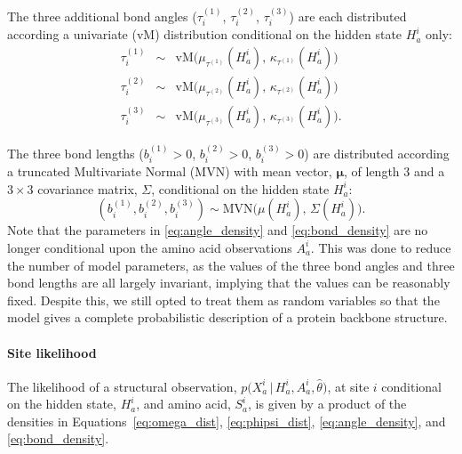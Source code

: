 \documentclass[nogrid]{MBE}%
\begin{document}
The three additional bond angles ($\tau^{(1)}_{i}$, $\tau^{(2)}_{i}$, $\tau^{(3)}_{i}$) are each distributed according a univariate (vM) distribution conditional on the hidden state $H_{a}^{i}$ only:
\begin{equation}
\label{eq:angle_density}
\begin{array}{ccc}
\tau^{(1)}_{i} & \sim & \text{vM}\big(\mu_{\tau^{(1)}}(H_{a}^{i}),\,\ensuremath{\kappa_{\tau^{(1)}}(H_{a}^{i})}\big)
\\
\tau^{(2)}_{i} & \sim & \text{vM}\big(\mu_{\tau^{(2)}}(H_{a}^{i}),\,\ensuremath{\kappa_{\tau^{(2)}}(H_{a}^{i})}\big)
\\
\tau^{(3)}_{i} & \sim & \text{vM}\big(\mu_{\tau^{(3)}}(H_{a}^{i}),\,\ensuremath{\kappa_{\tau^{(3)}}(H_{a}^{i})}\big).
\end{array}
\end{equation}

The three bond lengths ($b_{i}^{(1)}>0$, $b_{i}^{(2)}>0$, $b_{i}^{(3)}>0$) are 
distributed according a truncated Multivariate Normal (MVN)
with mean vector, $\mathbf{\mu}$, of length 3 and a $3 \times 3$ covariance matrix, $\Sigma$, conditional on the hidden state $H_{a}^{i}$:
\begin{equation}
\label{eq:bond_density}
(b_{i}^{(1)}, b_{i}^{(2)}, b_{i}^{(3)})  \sim \text{MVN}\big(\mu(H_a^{i}),\,\Sigma(H_a^{i})\big).
\end{equation}
Note that the parameters in \eqref{eq:angle_density} and \eqref{eq:bond_density} are no longer conditional upon the amino acid observations $A_{a}^{i}$. This was done to reduce the number of model parameters, as the values of the three bond angles and three bond lengths are all largely invariant, implying that the values can be reasonably fixed. Despite this, we still opted to treat them as random variables so that the model gives a complete probabilistic description of a protein backbone structure.

\paragraph{Site likelihood}
The likelihood of a structural observation, $p\big(X_{a}^{i}\,|\,H_{a}^{i},A_{a}^{i},\hat{\theta}\big)$, at site $i$ conditional on the hidden state, $H^{i}_a$, and amino acid, $S^{i}_a$, is given by a product of the densities in Equations~\ref{eq:omega_dist}, \ref{eq:phipsi_dist}, \ref{eq:angle_density}, and \ref{eq:bond_density}.
\end{document}
